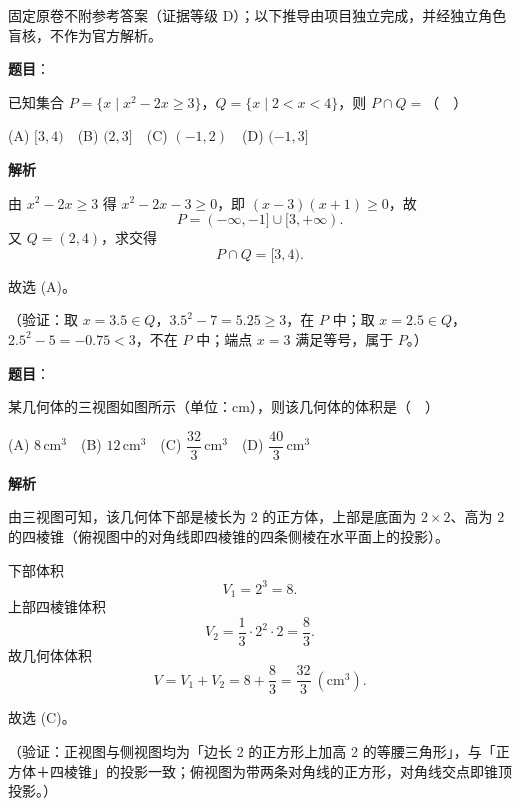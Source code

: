 
\begin{gktip}
固定原卷不附参考答案（证据等级 D）；以下推导由项目独立完成，并经独立角色盲核，不作为官方解析。
\end{gktip}

\begin{answer}

\textbf{题目}：

已知集合 \(P=\{x\mid x^2-2x\geqslant 3\}\)，\(Q=\{x\mid 2<x<4\}\)，则 \(P\cap Q=\)（　）

(A) \([3,4)\)　(B) \((2,3]\)　(C) \((-1,2)\)　(D) \((-1,3]\)

\textbf{解析}

由 \(x^2-2x\geqslant3\) 得 \(x^2-2x-3\geqslant0\)，即 \((x-3)(x+1)\geqslant0\)，故
\nopagebreak[4]
\[
P=(-\infty,-1]\cup[3,+\infty).
\]
又 \(Q=(2,4)\)，求交得
\nopagebreak[4]
\[
P\cap Q=[3,4).
\]

故选 (A)。

（验证：取 \(x=3.5\in Q\)，\(3.5^2-7=5.25\geqslant3\)，在 \(P\) 中；取 \(x=2.5\in Q\)，\(2.5^2-5=-0.75<3\)，不在 \(P\) 中；端点 \(x=3\) 满足等号，属于 \(P\)。）


\end{answer}
\begin{answer}

\textbf{题目}：

某几何体的三视图如图所示（单位：\(\mathrm{cm}\)），则该几何体的体积是（　）
\nopagebreak[4]
\begin{center}\end{center}
\nopagebreak[4]
(A) \(8\,\mathrm{cm}^3\)　(B) \(12\,\mathrm{cm}^3\)　(C) \(\dfrac{32}{3}\,\mathrm{cm}^3\)　(D) \(\dfrac{40}{3}\,\mathrm{cm}^3\)

\textbf{解析}

由三视图可知，该几何体下部是棱长为 \(2\) 的正方体，上部是底面为 \(2\times2\)、高为 \(2\) 的四棱锥（俯视图中的对角线即四棱锥的四条侧棱在水平面上的投影）。

下部体积
\nopagebreak[4]
\[
V_1=2^3=8.
\]
上部四棱锥体积
\nopagebreak[4]
\[
V_2=\frac13\cdot2^2\cdot2=\frac83.
\]
故几何体体积
\nopagebreak[4]
\[
V=V_1+V_2=8+\frac83=\frac{32}{3}\ \left(\mathrm{cm}^3\right).
\]

故选 (C)。

（验证：正视图与侧视图均为「边长 2 的正方形上加高 2 的等腰三角形」，与「正方体＋四棱锥」的投影一致；俯视图为带两条对角线的正方形，对角线交点即锥顶投影。）


\end{answer}
